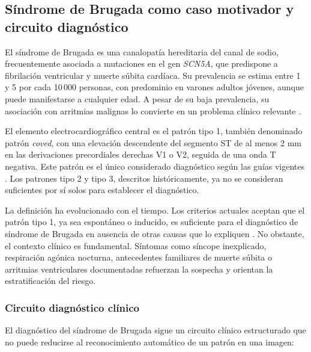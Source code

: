 \subsection{Síndrome de Brugada como caso motivador y circuito diagnóstico}

El síndrome de Brugada es una canalopatía hereditaria del canal de sodio, frecuentemente asociada a mutaciones en el gen \emph{SCN5A}, que predispone a fibrilación ventricular y muerte súbita cardíaca. Su prevalencia se estima entre 1 y 5 por cada 10\,000 personas, con predominio en varones adultos jóvenes, aunque puede manifestarse a cualquier edad. A pesar de su baja prevalencia, su asociación con arritmias malignas lo convierte en un problema clínico relevante \cite{sieira2017}.

El elemento electrocardiográfico central es el patrón tipo 1, también denominado patrón \emph{coved}, con una elevación descendente del segmento ST de al menos 2 mm en las derivaciones precordiales derechas V1 o V2, seguida de una onda T negativa. Este patrón es el único considerado diagnóstico según las guías vigentes \cite{zeppenfeld2022}. Los patrones tipo 2 y tipo 3, descritos históricamente, ya no se consideran suficientes por sí solos para establecer el diagnóstico.

La definición ha evolucionado con el tiempo. Los criterios actuales aceptan que el patrón tipo 1, ya sea espontáneo o inducido, es suficiente para el diagnóstico de síndrome de Brugada en ausencia de otras causas que lo expliquen \cite{zeppenfeld2022}. No obstante, el contexto clínico es fundamental. Síntomas como síncope inexplicado, respiración agónica nocturna, antecedentes familiares de muerte súbita o arritmias ventriculares documentadas refuerzan la sospecha y orientan la estratificación del riesgo.

\subsubsection{Circuito diagnóstico clínico}

El diagnóstico del síndrome de Brugada sigue un circuito clínico estructurado que no puede reducirse al reconocimiento automático de un patrón en una imagen:

